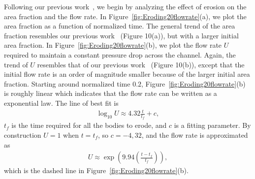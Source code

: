 \documentclass[preprint,10pt]{elsarticle}
\begin{document}
Following our previous work~\cite{qua-moo2018}, we begin by analyzing
the effect of erosion on the area fraction and the flow rate.  In
Figure~\ref{fig:Eroding20flowrate}(a), we plot the area fraction as a
function of normalized time.  The general trend of the area fraction
resembles our previous work~\cite{qua-moo2018} (Figure 10(a)), but with
a larger initial area fraction.  In
Figure~\ref{fig:Eroding20flowrate}(b), we plot the flow rate $U$
required to maintain a constant pressure drop across the channel.
Again, the trend of $U$ resembles that of our previous
work~\cite{qua-moo2018} (Figure 10(b)), except that the initial flow
rate is an order of magnitude smaller because of the larger initial area
fraction.  Starting around normalized time $0.2$,
Figure~\ref{fig:Eroding20flowrate}(b) is roughly linear which indicates
that the flow rate can be written as a exponential law.  The line of
best fit is
\begin{align} 
  \log_{10} U \approx 4.32 \frac{t}{t_f} + c, 
\end{align}
$t_f$ is the time required for all the bodies to erode, and $c$ is a
fitting parameter. By construction $U = 1$ when $t=t_f$, so $c=-4,32$,
and the flow rate is approximated as
\begin{align}
  U \approx \exp\left(9.94 \left(\frac{t - t_f}{t_f} \right)\right),
\end{align}
which is the dashed line in Figure~\ref{fig:Eroding20flowrate}(b).
\end{document}

